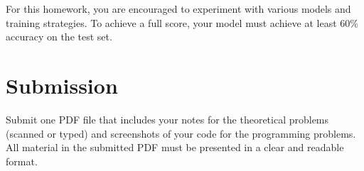 \documentclass[
  letterpaper,
  DIV=11,
  numbers=noendperiod]{scrartcl}
\begin{document}
For this homework, you are encouraged to experiment with various models
and training strategies. To achieve a full score, your model must
achieve at least 60\% accuracy on the test set.

\section{Submission}\label{submission}

Submit one PDF file that includes your notes for the theoretical
problems (scanned or typed) and screenshots of your code for the
programming problems. All material in the submitted PDF must be
presented in a clear and readable format.
\end{document}
